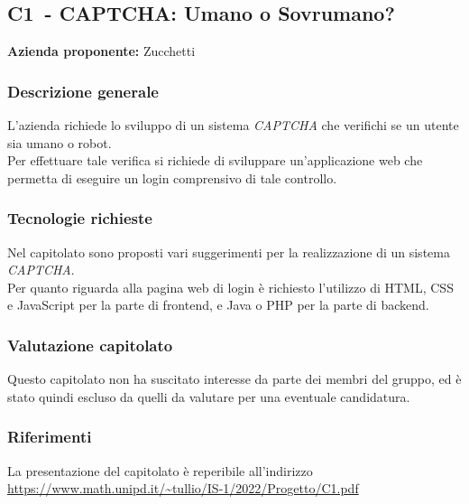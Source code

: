
\renewcommand{\capName}{CAPTCHA: Umano o Sovrumano?} %
\renewcommand{\capCode}{C1} %
\renewcommand{\capLink}{https://www.math.unipd.it/~tullio/IS-1/2022/Progetto/C1.pdf} %
\renewcommand{\capProposer}{Zucchetti} %


\subsection{\capCode\ - \capName}
\textbf{Azienda proponente:} Zucchetti
\subsubsection{Descrizione generale}
L'azienda richiede lo sviluppo di un sistema \emph{CAPTCHA} che verifichi se un utente sia umano o robot. \\
Per effettuare tale verifica si richiede di sviluppare un'applicazione web che permetta di eseguire un login comprensivo di tale controllo.

\subsubsection{Tecnologie richieste}
Nel capitolato sono proposti vari suggerimenti per la realizzazione di un sistema \emph{CAPTCHA}. \\
Per quanto riguarda alla pagina web di login è richiesto l'utilizzo di HTML, CSS e JavaScript per la parte di frontend, e Java o PHP per la parte di backend.

\subsubsection{Valutazione capitolato}
Questo capitolato non ha suscitato interesse da parte dei membri del gruppo, ed è stato quindi escluso da quelli da valutare per una eventuale candidatura.

\subsubsection{Riferimenti}
La presentazione del capitolato è reperibile all'indirizzo \url{\capLink} \hfill{}